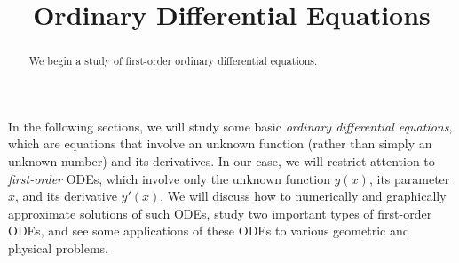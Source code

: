 \documentclass{ximera}
\title{Ordinary Differential Equations}
\begin{document}
\begin{abstract}
We begin a study of first-order ordinary differential equations.
\end{abstract}
\maketitle

In the following sections, we will study some basic \textit{ordinary differential equations}, which are equations that involve an unknown function (rather than simply an unknown number) and its derivatives. In our case, we will restrict attention to \textit{first-order} ODEs, which involve only the unknown function $y(x)$, its parameter $x$, and its derivative $y'(x)$. We will discuss how to numerically and graphically approximate solutions of such ODEs, study two important types of first-order ODEs, and see some applications of these ODEs to various geometric and physical problems.
\end{document}
